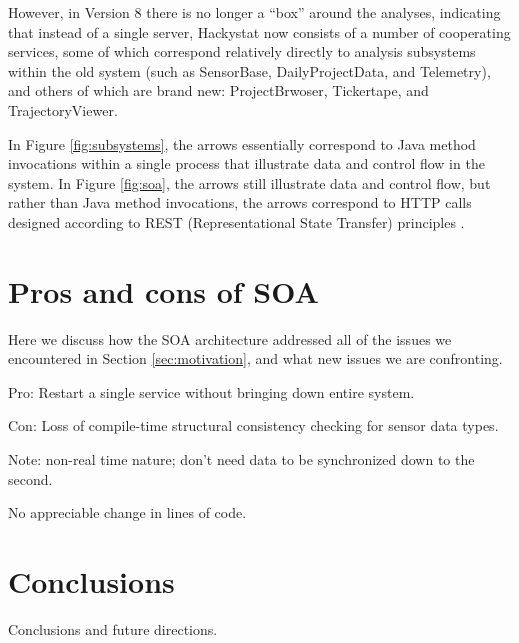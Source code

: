 \documentclass[conference,compsoc,peerreview]{IEEEtran}
\begin{document}
However, in Version 8 there is no longer a ``box'' around the analyses,
indicating that instead of a single server, Hackystat now consists of a
number of cooperating services, some of which correspond relatively
directly to analysis subsystems within the old system (such as SensorBase,
DailyProjectData, and Telemetry), and others of which are brand new:
ProjectBrwoser, Tickertape, and TrajectoryViewer.

In Figure \ref{fig:subsystems}, the arrows essentially correspond to Java
method invocations within a single process that illustrate data and control
flow in the system.  In Figure \ref{fig:soa}, the arrows still illustrate
data and control flow, but rather than Java method invocations, the arrows
correspond to HTTP calls designed according to REST (Representational State
Transfer) principles \cite{Fielding02}. 



\section{Pros and cons of SOA}
\label{sec:discussion}

Here we discuss how the SOA architecture addressed all of the issues we encountered in Section \ref{sec:motivation}, and what new issues we are confronting. 

Pro: Restart a single service without bringing down entire system.

Con: Loss of compile-time structural consistency checking for sensor data types.

Note: non-real time nature; don't need data to be synchronized down to the second. 

No appreciable change in lines of code. 

\section{Conclusions}
\label{sec:conclusion}

Conclusions and future directions. 




\end{document}
